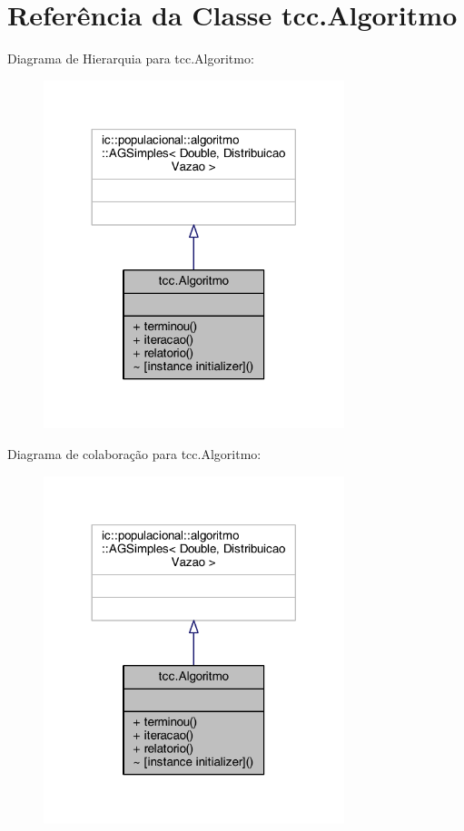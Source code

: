 \hypertarget{classtcc_1_1_algoritmo}{\section{Referência da Classe tcc.\-Algoritmo}
\label{classtcc_1_1_algoritmo}
}


Diagrama de Hierarquia para tcc.\-Algoritmo\-:
\nopagebreak
\begin{figure}[H]
\begin{center}
\leavevmode
\includegraphics[width=248pt]{classtcc_1_1_algoritmo__inherit__graph}
\end{center}
\end{figure}


Diagrama de colaboração para tcc.\-Algoritmo\-:
\nopagebreak
\begin{figure}[H]
\begin{center}
\leavevmode
\includegraphics[width=248pt]{classtcc_1_1_algoritmo__coll__graph}
\end{center}
\end{figure}
